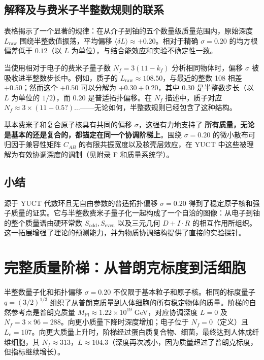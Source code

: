 \documentclass[12pt,a4paper]{article}
\begin{document}
	\subsection{解释及与费米子半整数规则的联系}
	
	表格揭示了一个显著的规律：在从介子到铀的五个数量级质量范围内，原始深度 $L_{\mathrm{raw}}$ 围绕半整数值振荡，平均偏移 $\langle \delta L \rangle \approx +0.20$。相对于精确 $\sigma = 0.20$ 的均方根偏差低于 $0.12$（以 $L$ 为单位），与结合能效应和实验不确定性一致。
	
	当使用相对于电子的费米子量子数 $N_f = 3(11 - k_f)$ 分析相同物体时，偏移 $\sigma$ 被吸收进半整数步长中。例如，质子的 $L_{\mathrm{raw}} \approx 108.50$，与最近的整数 108 相差 $+0.50$；然而这个 $+0.50$ 可以分解为 $+0.30 + 0.20$，其中 $0.30$ 是半整数步长（以 $L$ 为单位的 $1/2$），而 $0.20$ 是普适拓扑偏移。在 $N_f$ 描述中，质子对应 $N_f \approx 3 \times (11 - 0.5?) \dots$——无论如何，半整数规则已经包含了这种结构。
	
	基本费米子和复合原子核具有共同的偏移 $\sigma$，这强有力地支持了 \textbf{所有质量，无论是基本的还是复合的，都锚定在同一个协调阶梯上}。围绕 $\sigma=0.20$ 的微小散布可归因于兼容性矩阵 $C_{AB}$ 的有限共振宽度以及核壳层效应，在 YUCT 中这些被理解为有效协调深度的调制（见附录 F 和质量系统学）。
	
	\subsection{小结}
	
	源于 YUCT 代数环且无自由参数的普适拓扑偏移 $\sigma = 0.20$ 得到了稳定原子核和强子质量的证实。它与半整数费米子量子化一起构成了一个自洽的图像：从电子到铀的整个质量谱由硬环常数 $S_{\mathrm{odd}}, S_{\mathrm{even}}$ 以及三元几何 $D+I\cdot R$ 的相互作用所组织。这一拓展增强了理论的预测能力，并为物质协调结构提供了直接的实验探针。
	
	\section{完整质量阶梯：从普朗克标度到活细胞}
	\label{sec:complete_ladder}
	
	半整数量子化和拓扑偏移 $\sigma = 0.20$ 不仅限于基本粒子和原子核。相同的标度量子 $q = (3/2)^{1/3}$ 组织了从普朗克质量到人体细胞的所有稳定物体的质量。阶梯的自然参考点是普朗克质量 $M_{\mathrm{Pl}} \approx 1.22 \times 10^{19}$ GeV，对应协调深度 $L = 0$ 及 $N_f = 3 \times 96 = 288$。向更小质量下降时深度增加；电子位于 $N_f = 0$（定义）且 $L_e = 107$。向更大质量上升时，阶梯经过蛋白质复合物、细菌，最终达到人体成纤维细胞，其 $N_f \approx 313$，$L \approx 104.3$（深度再次减小，因为质量超过了普朗克标度，但指标继续增长）。
	
\end{document}
